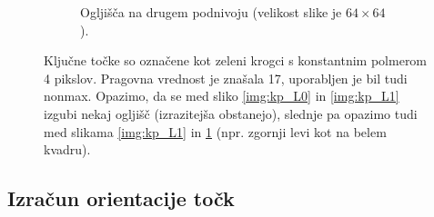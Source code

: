\documentclass[a4paper,11pt]{article}
\begin{document}
\begin{figure}[h!b]
\begin{subfigure}[t]{0.48\textwidth}
		\caption{Ogljišča na drugem podnivoju (velikost slike je $64\times64$).}
		\label{img:kp_L2}
	\end{subfigure}
	\caption{Ključne točke so označene kot zeleni krogci s konstantnim polmerom 4 pikslov. Pragovna vrednost je znašala 17, uporabljen je bil tudi nonmax. Opazimo, da se med sliko \ref{img:kp_L0} in \ref{img:kp_L1} izgubi nekaj ogljišč (izrazitejša obstanejo), slednje pa opazimo tudi med slikama \ref{img:kp_L1} in \ref{img:kp_L2} (npr. zgornji levi kot na belem kvadru).}
	\label{img:kp_size_comparison}
\end{figure}

\clearpage

\subsection{Izračun orientacije točk}
\end{document}
